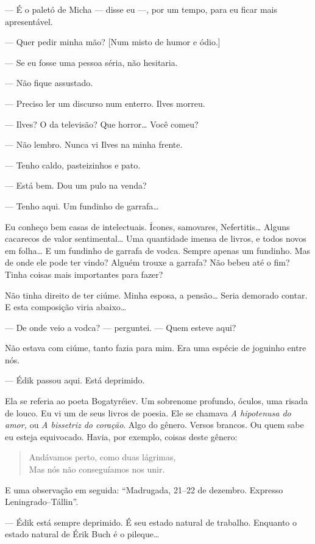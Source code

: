--- É o paletó de Micha --- disse eu ---, por um tempo, para eu ficar
mais apresentável.

--- Quer pedir minha mão? {[}Num misto de humor e ódio.{]}

--- Se eu fosse uma pessoa séria, não hesitaria.

--- Não fique assustado.

--- Preciso ler um discurso num enterro. Ilves morreu.

--- Ilves? O da televisão? Que horror\ldots{} Você comeu?

--- Não lembro. Nunca vi Ilves na minha frente.

--- Tenho caldo, pasteizinhos e pato.

--- Está bem. Dou um pulo na venda?

--- Tenho aqui. Um fundinho de garrafa\ldots{}

Eu conheço bem casas de intelectuais. Ícones, samovares, Nefertitis\ldots{}
Alguns cacarecos de valor sentimental\ldots{} Uma quantidade imensa de
livros, e todos novos em folha\ldots{} E um fundinho de garrafa de vodca.
Sempre apenas um fundinho. Mas de onde ele pode ter vindo? Alguém trouxe
a garrafa? Não bebeu até o fim? Tinha coisas mais importantes para
fazer?

Não tinha direito de ter ciúme. Minha esposa, a pensão\ldots{} Seria demorado
contar. E esta composição viria abaixo\ldots{}

--- De onde veio a vodca? --- perguntei. --- Quem esteve aqui?

Não estava com ciúme, tanto fazia para mim. Era uma espécie de joguinho
entre nós.

--- Édik passou aqui. Está deprimido.

Ela se referia ao poeta Bogatyréiev. Um sobrenome profundo, óculos, uma
risada de louco. Eu vi um de seus livros de poesia. Ele se chamava
\emph{A hipotenusa do amor,} ou \emph{A bissetriz do coração}. Algo do
gênero. Versos brancos. Ou quem sabe eu esteja equivocado. Havia, por
exemplo, coisas deste gênero:

\begin{verse}
Andávamos perto, como duas lágrimas,\\
Mas nós não conseguíamos nos unir.
\end{verse}

E uma observação em seguida: ``Madrugada, 21--22 de dezembro. Expresso
Leningrado--Tállin''.

--- Édik está sempre deprimido. É seu estado natural de trabalho.
Enquanto o estado natural de Érik Buch é o pileque\ldots{}

